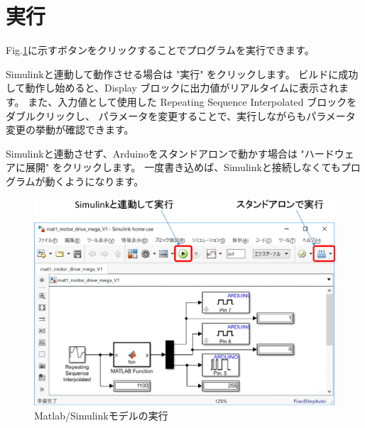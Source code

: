 \clearpage
\section{実行}\label{dux30d7ux30eaux30f3ux30bfux306eux57faux672cux7684ux306aux69cbux9020}

Fig.\ref{fig206}に示すボタンをクリックすることでプログラムを実行できます。

Simulinkと連動して動作させる場合は "実行" をクリックします。
ビルドに成功して動作し始めると、Display ブロックに出力値がリアルタイムに表示されます。
また、入力値として使用した Repeating Sequence Interpolated ブロックをダブルクリックし、
パラメータを変更することで、実行しながらもパラメータ変更の挙動が確認できます。

Simulinkと連動させず、Arduinoをスタンドアロンで動かす場合は "ハードウェアに展開" をクリックします。
一度書き込めば、Simulinkと接続しなくてもプログラムが動くようになります。

\begin{figure}[htbp]
\centering
\includegraphics[width=350pt]{fig/fig206.eps}
\caption{Matlab/Simulinkモデルの実行}
\label{fig206}
\end{figure}
